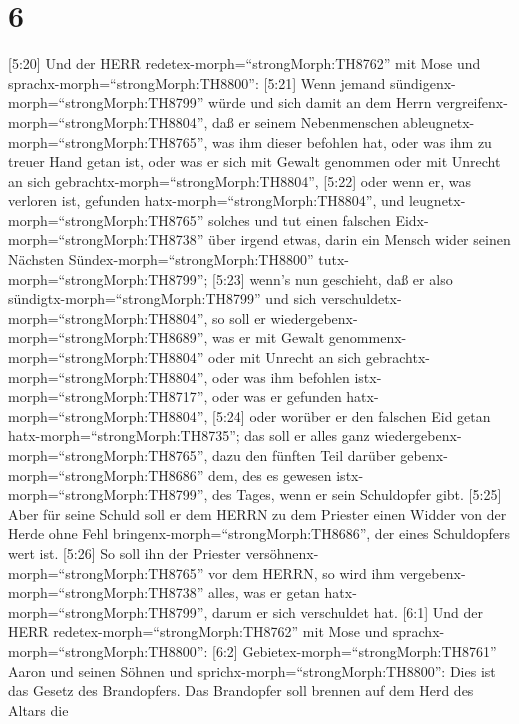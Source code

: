 \hypertarget{section-5}{%
\section{6}\label{section-5}}

 {[}5:20{]} Und der HERR
redetex-morph=``strongMorph:TH8762'' mit Mose und
sprachx-morph=``strongMorph:TH8800'':  {[}5:21{]} Wenn
jemand sündigenx-morph=``strongMorph:TH8799'' würde und sich damit an
dem Herrn vergreifenx-morph=``strongMorph:TH8804'', daß er seinem
Nebenmenschen ableugnetx-morph=``strongMorph:TH8765'', was ihm dieser
befohlen hat, oder was ihm zu treuer Hand getan ist, oder was er sich
mit Gewalt genommen oder mit Unrecht an sich
gebrachtx-morph=``strongMorph:TH8804'',  {[}5:22{]} oder
wenn er, was verloren ist, gefunden hatx-morph=``strongMorph:TH8804'',
und leugnetx-morph=``strongMorph:TH8765'' solches und tut einen falschen
Eidx-morph=``strongMorph:TH8738'' über irgend etwas, darin ein Mensch
wider seinen Nächsten Sündex-morph=``strongMorph:TH8800''
tutx-morph=``strongMorph:TH8799'';  {[}5:23{]} wenn's nun
geschieht, daß er also sündigtx-morph=``strongMorph:TH8799'' und sich
verschuldetx-morph=``strongMorph:TH8804'', so soll er
wiedergebenx-morph=``strongMorph:TH8689'', was er mit Gewalt
genommenx-morph=``strongMorph:TH8804'' oder mit Unrecht an sich
gebrachtx-morph=``strongMorph:TH8804'', oder was ihm befohlen
istx-morph=``strongMorph:TH8717'', oder was er gefunden
hatx-morph=``strongMorph:TH8804'',  {[}5:24{]} oder worüber
er den falschen Eid getan hatx-morph=``strongMorph:TH8735''; das soll er
alles ganz wiedergebenx-morph=``strongMorph:TH8765'', dazu den fünften
Teil darüber gebenx-morph=``strongMorph:TH8686'' dem, des es gewesen
istx-morph=``strongMorph:TH8799'', des Tages, wenn er sein Schuldopfer
gibt.  {[}5:25{]} Aber für seine Schuld soll er dem HERRN zu
dem Priester einen Widder von der Herde ohne Fehl
bringenx-morph=``strongMorph:TH8686'', der eines Schuldopfers wert ist.
 {[}5:26{]} So soll ihn der Priester
versöhnenx-morph=``strongMorph:TH8765'' vor dem HERRN, so wird ihm
vergebenx-morph=``strongMorph:TH8738'' alles, was er getan
hatx-morph=``strongMorph:TH8799'', darum er sich verschuldet hat.
 {[}6:1{]} Und der HERR redetex-morph=``strongMorph:TH8762''
mit Mose und sprachx-morph=``strongMorph:TH8800'': 
{[}6:2{]} Gebietex-morph=``strongMorph:TH8761'' Aaron und seinen Söhnen
und sprichx-morph=``strongMorph:TH8800'': Dies ist das Gesetz des
Brandopfers. Das Brandopfer soll brennen auf dem Herd des Altars die
